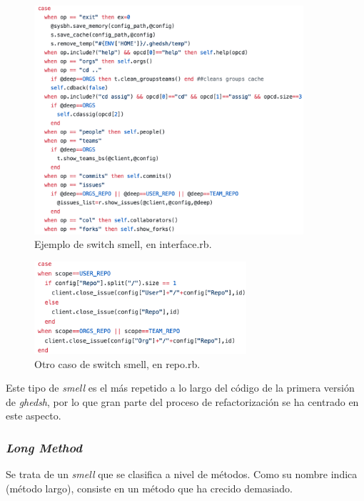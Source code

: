   \begin{figure}[H]
    \begin{center}
    \includegraphics[width=0.89\textwidth]{images/switch-smell}
    \caption{Ejemplo de switch smell, en interface.rb.}
    \label{fig:switch-smell}
    \end{center}
  \end{figure}
  \bigskip

  \begin{figure}[H]
    \begin{center}
    \includegraphics[width=0.70\textwidth]{images/switch-smell2}
    \caption{Otro caso de switch smell, en repo.rb.}
    \label{fig:switch-smell2}
    \end{center}
  \end{figure}
  \bigskip

  Este tipo de {\it smell} es el más repetido a lo largo del código de la primera versión de {\it ghedsh}, por lo que gran parte del proceso de refactorización se ha centrado en este aspecto.
  \bigskip
  \subsubsection{{\it \textbf{Long Method}}} 
  Se trata de un {\it smell} que se clasifica a nivel de métodos. Como su nombre indica (método largo), consiste en un método que ha crecido demasiado. 
  \bigskip

